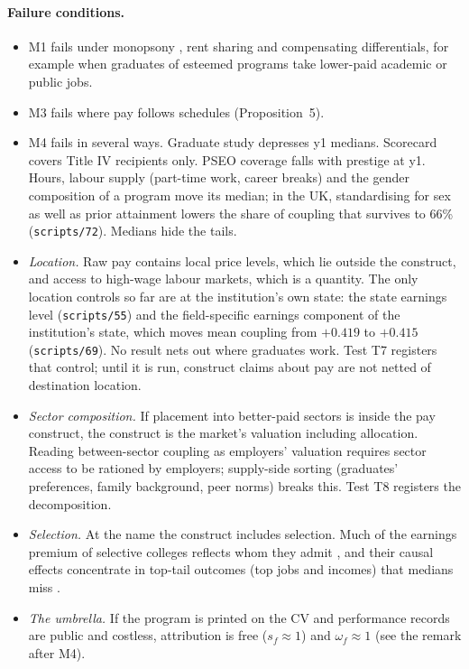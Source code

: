 \paragraph{Failure conditions.}
\begin{itemize}
\item M1 fails under monopsony \citep{staiger2010there}, rent sharing and compensating differentials, for example
when graduates of esteemed programs take lower-paid academic or public jobs.
\item M3 fails where pay follows schedules (Proposition~5).
\item M4 fails in several ways. Graduate study depresses y1 medians. Scorecard covers Title IV recipients only.
PSEO coverage falls with prestige at y1. Hours, labour supply (part-time work, career breaks) and the gender
composition of a program move its median; in the UK, standardising for sex as well as prior attainment lowers
the share of coupling that survives to 66\% (\texttt{scripts/72}). Medians hide the tails.
\item \emph{Location.} Raw pay contains local price levels, which lie outside the construct, and access to
high-wage labour markets, which is a quantity. The only location controls so far are at the institution's own
state: the state earnings level (\texttt{scripts/55}) and the field-specific earnings component of the
institution's state, which moves mean coupling from $+0.419$ to $+0.415$ (\texttt{scripts/69}). No result nets out
where graduates work. Test T7 registers that control; until it is run, construct claims about pay are not netted
of destination location.
\item \emph{Sector composition.} If placement into better-paid sectors is inside the pay construct, the construct
is the market's valuation including allocation. Reading between-sector coupling as employers' valuation requires
sector access to be rationed by employers; supply-side sorting (graduates' preferences, family background, peer
norms) breaks this. Test T8 registers the decomposition.
\item \emph{Selection.} At the name the construct includes selection. Much of the earnings premium of selective
colleges reflects whom they admit \citep{dale2002estimating,dale2014estimating}, and their causal effects
concentrate in top-tail outcomes (top jobs and incomes) that medians miss \citep{zimmerman2019elite,chetty2023diversifying}.
\item \emph{The umbrella.} If the program is printed on the CV and performance records are public and costless,
attribution is free ($s_f\approx1$) and $\omega_f\approx1$ (see the remark after M4).
\end{itemize}

